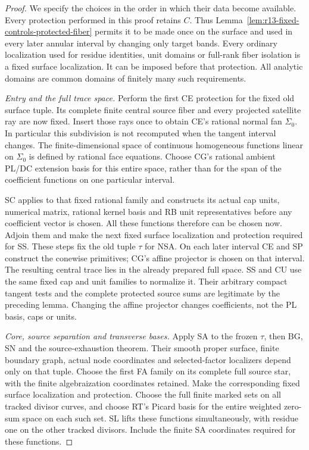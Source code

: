 \begin{proof}
We specify the choices in the order in which their data
become available.  Every protection performed in this
proof retains \(C\).  Thus Lemma~\ref{lem:r13-fixed-controls-protected-fiber}
permits it to be made once on the surface and used in
every later annular interval by changing only target bands.
Every ordinary localization used for residue identities,
unit domains or full-rank fiber isolation is a fixed
surface localization.  It can be imposed before that
protection.  All analytic domains are common domains of
finitely many such requirements.

\emph{Entry and the full trace space.}
Perform the first CE protection for the fixed old surface
tuple.  Its complete finite central source fiber and every
projected satellite ray are now fixed.  Insert those rays
once to obtain CE's rational normal fan \(\Sigma_0\).
In particular this subdivision is not recomputed when
the tangent interval changes.  The finite-dimensional
space of continuous homogeneous functions linear on
\(\Sigma_0\) is defined by rational face equations.
Choose CG's rational ambient PL/DC extension basis for
this entire space, rather than for the span of the
coefficient functions on one particular interval.

SC applies to that fixed rational family and constructs
its actual cap units, numerical matrix, rational kernel
basis and RB unit representatives before any coefficient
vector is chosen.  All these functions therefore can be
chosen now.  Adjoin them and make the next fixed surface
localization and protection required for SS.  These steps
fix the old tuple \(\tau\) for NSA.  On each later
interval CE and SP construct the conewise primitives;
CG's affine projector is chosen on that interval.  The
resulting central trace lies in the already prepared
full space.  SS and CU use the same fixed cap and unit
families to normalize it.  Their arbitrary compact
tangent tests and the complete protected source sums
are legitimate by the preceding lemma.  Changing the
affine projector changes coefficients, not the PL
basis, caps or units.

\emph{Core, source separation and transverse bases.}
Apply SA to the frozen \(\tau\), then BG, SN and the
source-exhaustion theorem.  Their smooth proper surface,
finite boundary graph, actual node coordinates and
selected-factor localizers depend only on that tuple.
Choose the first FA family on its complete full source
star, with the finite algebraization coordinates retained.
Make the corresponding fixed surface localization and
protection.  Choose the full finite marked sets on all
tracked divisor curves, and choose RT's Picard basis for
the entire weighted zero-sum space on each such set.
SL lifts these functions simultaneously, with residue
one on the other tracked divisors.  Include the finite
SA coordinates required for these functions.


\end{proof}
